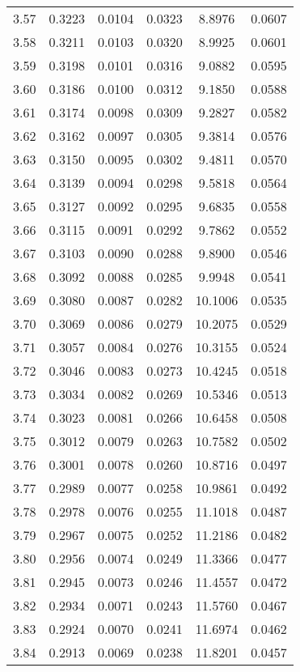 \documentclass{article}
\begin{document}
\begin{longtable}{cccccc}
3.57 & 0.3223 & 0.0104 & 0.0323 & 8.8976 & 0.0607 \\
3.58 & 0.3211 & 0.0103 & 0.0320 & 8.9925 & 0.0601 \\
3.59 & 0.3198 & 0.0101 & 0.0316 & 9.0882 & 0.0595 \\
3.60 & 0.3186 & 0.0100 & 0.0312 & 9.1850 & 0.0588 \\
3.61 & 0.3174 & 0.0098 & 0.0309 & 9.2827 & 0.0582 \\
3.62 & 0.3162 & 0.0097 & 0.0305 & 9.3814 & 0.0576 \\
3.63 & 0.3150 & 0.0095 & 0.0302 & 9.4811 & 0.0570 \\
3.64 & 0.3139 & 0.0094 & 0.0298 & 9.5818 & 0.0564 \\
3.65 & 0.3127 & 0.0092 & 0.0295 & 9.6835 & 0.0558 \\
3.66 & 0.3115 & 0.0091 & 0.0292 & 9.7862 & 0.0552 \\
3.67 & 0.3103 & 0.0090 & 0.0288 & 9.8900 & 0.0546 \\
3.68 & 0.3092 & 0.0088 & 0.0285 & 9.9948 & 0.0541 \\
3.69 & 0.3080 & 0.0087 & 0.0282 & 10.1006 & 0.0535 \\
3.70 & 0.3069 & 0.0086 & 0.0279 & 10.2075 & 0.0529 \\
3.71 & 0.3057 & 0.0084 & 0.0276 & 10.3155 & 0.0524 \\
3.72 & 0.3046 & 0.0083 & 0.0273 & 10.4245 & 0.0518 \\
3.73 & 0.3034 & 0.0082 & 0.0269 & 10.5346 & 0.0513 \\
3.74 & 0.3023 & 0.0081 & 0.0266 & 10.6458 & 0.0508 \\
3.75 & 0.3012 & 0.0079 & 0.0263 & 10.7582 & 0.0502 \\
3.76 & 0.3001 & 0.0078 & 0.0260 & 10.8716 & 0.0497 \\
3.77 & 0.2989 & 0.0077 & 0.0258 & 10.9861 & 0.0492 \\
3.78 & 0.2978 & 0.0076 & 0.0255 & 11.1018 & 0.0487 \\
3.79 & 0.2967 & 0.0075 & 0.0252 & 11.2186 & 0.0482 \\
3.80 & 0.2956 & 0.0074 & 0.0249 & 11.3366 & 0.0477 \\
3.81 & 0.2945 & 0.0073 & 0.0246 & 11.4557 & 0.0472 \\
3.82 & 0.2934 & 0.0071 & 0.0243 & 11.5760 & 0.0467 \\
3.83 & 0.2924 & 0.0070 & 0.0241 & 11.6974 & 0.0462 \\
3.84 & 0.2913 & 0.0069 & 0.0238 & 11.8201 & 0.0457 \\

\end{longtable}
\end{document}
